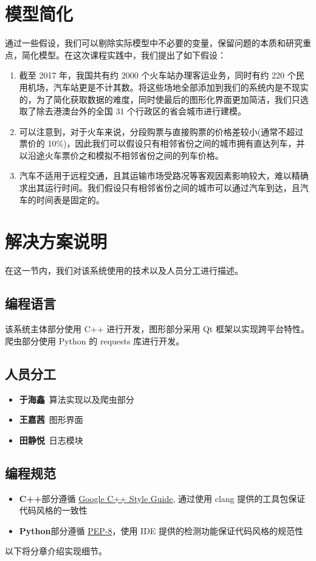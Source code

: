 \documentclass[blue]{elegantbook}
\begin{document}
\section{模型简化}
通过一些假设，我们可以剔除实际模型中不必要的变量，保留问题的本质和研究重点，简化模型。在这次课程实践中，我们提出了如下假设：
\begin{enumerate}
	\item 截至 2017 年，我国共有约 2000 个火车站办理客运业务，同时有约 220 个民用机场，汽车站更是不计其数。将这些场地全部添加到我们的系统内是不现实的，为了简化获取数据的难度，同时使最后的图形化界面更加简洁，我们只选取了除去港澳台外的全国 31 个行政区的省会城市进行建模。
	\item 可以注意到，对于火车来说，分段购票与直接购票的价格差较小(通常不超过票价的 10\%)，因此我们可以假设只有相邻省份之间的城市拥有直达列车，并以沿途火车票价之和模拟不相邻省份之间的列车价格。
	\item 汽车不适用于远程交通，且其运输市场受路况等客观因素影响较大，难以精确求出其运行时间。我们假设只有相邻省份之间的城市可以通过汽车到达，且汽车的时间表是固定的。
\end{enumerate}

\section{解决方案说明}
在这一节内，我们对该系统使用的技术以及人员分工进行描述。
\subsection{编程语言}
该系统主体部分使用 C++ 进行开发，图形部分采用 Qt 框架以实现跨平台特性。爬虫部分使用 Python 的 requests 库进行开发。
\subsection{人员分工}
\begin{itemize}
	\item \textbf{于海鑫}\ 算法实现以及爬虫部分
	\item \textbf{王嘉茜}\ 图形界面
	\item \textbf{田静悦}\ 日志模块
\end{itemize}
\subsection{编程规范}
\begin{itemize}
	\item \textbf{C++}部分遵循 \href{http://www.nscscc.org/uploads/soft/170318/1-1F31P20H9.docxhttp://google.github.io/styleguide/cppguide}{Google C++ Style Guide}, 通过使用 clang 提供的工具包保证代码风格的一致性
	\item \textbf{Python}部分遵循 \href{https://www.python.org/dev/peps/pep-0008/}{PEP-8}，使用 IDE 提供的检测功能保证代码风格的规范性
\end{itemize}
\vspace*{3 ex}
以下将分章介绍实现细节。
\end{document}
